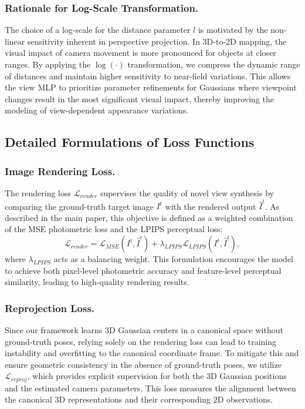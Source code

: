 \subsubsection{Rationale for Log-Scale Transformation.}
The choice of a log-scale for the distance parameter $l$ is motivated by the non-linear sensitivity inherent in perspective projection. In 3D-to-2D mapping, the visual impact of camera movement is more pronounced for objects at closer ranges. By applying the $\log(\cdot)$ transformation, we compress the dynamic range of distances and maintain higher sensitivity to near-field variations. This allows the view MLP to prioritize parameter refinements for Gaussians where viewpoint changes result in the most significant visual impact, thereby improving the modeling of view-dependent appearance variations.

\subsection{Detailed Formulations of Loss Functions}
\subsubsection{Image Rendering Loss.} The rendering loss $\mathcal{L}_{render}$ supervises the quality of novel view synthesis by comparing the ground-truth target image $I^t$ with the rendered output $\hat{I}^t$. As described in the main paper, this objective is defined as a weighted combination of the MSE photometric loss and the LPIPS \cite{zhang2018lpips} perceptual loss:
\begin{equation}
    \mathcal{L}_{render} = \mathcal{L}_{MSE}(I^t, \hat{I}^t) + \lambda_{LPIPS} \mathcal{L}_{LPIPS}(I^t, \hat{I}^t),
    \label{eq:renderingloss}
\end{equation}
where $\lambda_{LPIPS}$ acts as a balancing weight. This formulation encourages the model to achieve both pixel-level photometric accuracy and feature-level perceptual similarity, leading to high-quality rendering results.

\subsubsection{Reprojection Loss.} Since our framework learns 3D Gaussian centers in a canonical space without ground-truth poses, relying solely on the rendering loss can lead to training instability and overfitting to the canonical coordinate frame. To mitigate this and ensure geometric consistency in the absence of ground-truth poses, we utilize $\mathcal{L}_{reproj}$, which provides explicit supervision for both the 3D Gaussian positions and the estimated camera parameters. This loss measures the alignment between the canonical 3D representations and their corresponding 2D observations.

